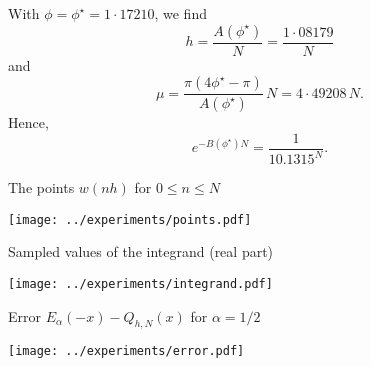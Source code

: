\documentclass{beamer}
\begin{document}
\begin{frame}
With $\phi=\phi^\star=1{\cdot}17210$, we find
\[
h=\frac{A(\phi^\star)}{N}=\frac{1{\cdot}08179}{N}
\]
and
\[
\mu=\frac{\pi(4\phi^\star-\pi)}{A(\phi^\star)}\,N=4{\cdot}49208\,N.
\]
Hence,
\[
e^{-B(\phi^\star)N}=\frac{1}{10.1315^N}.
\]
\end{frame}
\begin{frame}{The points $w(nh)$ for $0\le n\le N$}
\begin{center}
\texttt{[image: ../experiments/points.pdf]} 
\end{center}
\end{frame}
\begin{frame}{Sampled values of the integrand (real part)}
\begin{center}
\texttt{[image: ../experiments/integrand.pdf]} 
\end{center}
\end{frame}
\begin{frame}{Error $E_\alpha(-x)-Q_{h,N}(x)$ for $\alpha=1/2$}
\begin{center}
\texttt{[image: ../experiments/error.pdf]} 
\end{center}
\end{frame}
\end{document}
